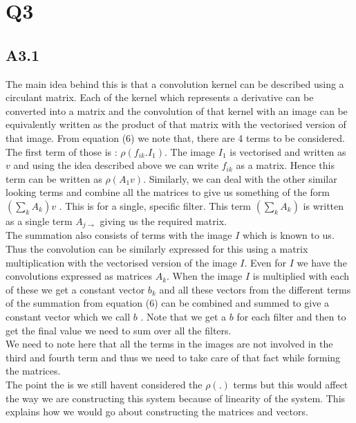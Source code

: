 \documentclass{article}
\begin{document}
\section*{Q3}
\subsection*{A3.1}

The main idea behind this is that a convolution kernel can be described using a circulant matrix. Each of the kernel which represents a derivative can be converted into a matrix and the convolution of that kernel with an image can be equivalently written as the product of that matrix with the vectorised version of that image. From equation (6) we note that, there are 4 terms to be considered.
The first term of those is : $\rho(f_{ik}.I_1)$. The image $I_1$  is vectorised and written as $v$ and using the idea described above we can write $f_{ik}$ as a matrix. Hence this term can be written as $\rho(A_1v)$. Similarly, we can deal with the other similar looking terms and combine all the matrices to give us something of the form $ (\sum_k A_k)v $ . This is for a single, specific filter. This term $ (\sum_k A_k) $ is written as a single term $ A_{j\rightarrow} $ giving us the required matrix. \\

The summation also consists of terms with the image $I$ which is known to us. Thus the convolution can be similarly expressed for this using a matrix multiplication with the vectorised version of the image $I$. Even for $I$ we have the convolutions expressed as matrices $A_k$. When the image $I$ is multiplied with each of these we get a constant vector $b_k$ and all these vectors from the different terms of the summation from equation (6) can be combined and summed to give a constant vector which we call $b$ .  Note that we get a $b$ for each filter and then to get the final value we need to sum over all the filters. \\ 

We need to note here that all the terms in the images are not involved in the third and fourth term and thus we need to take care of that fact while forming the matrices. \\

The point the is we still havent considered the $\rho(.) $ terms but this would affect the way we are constructing this system because of linearity of the system. This explains how we would go about constructing the matrices and vectors. \\
\end{document}
